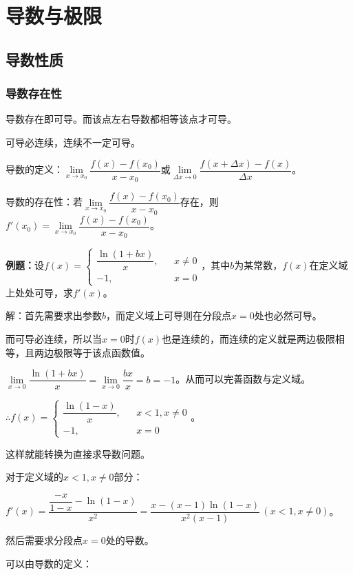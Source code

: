 \chapter{导数与极限}
\section{导数性质}

\subsection{导数存在性}

导数存在即可导。而该点左右导数都相等该点才可导。

可导必连续，连续不一定可导。

导数的定义：$\lim\limits_{x\to x_0}\dfrac{f(x)-f(x_0)}{x-x_0}$或$\lim\limits_{\Delta x\to 0}\dfrac{f(x+\Delta x)-f(x)}{\Delta x}$。

导数的存在性：若$\lim\limits_{x\to x_0}\dfrac{f(x)-f(x_0)}{x-x_0}$存在，则$f'(x_0)=\lim\limits_{x\to x_0}\dfrac{f(x)-f(x_0)}{x-x_0}$。\medskip

\textbf{例题：}设$f(x)=\left\{\begin{array}{lcl}
    \dfrac{\ln(1+bx)}{x}, & & x\neq 0 \\
    -1, & & x=0
\end{array}
\right.$，其中$b$为某常数，$f(x)$在定义域上处处可导，求$f'(x)$。

解：首先需要求出参数$b$，而定义域上可导则在分段点$x=0$处也必然可导。

而可导必连续，所以当$x=0$时$f(x)$也是连续的，而连续的定义就是两边极限相等，且两边极限等于该点函数值。\medskip

$\lim\limits_{x\to 0}\dfrac{\ln(1+bx)}{x}=\lim\limits_{x\to 0}\dfrac{bx}{x}=b=-1$。从而可以完善函数与定义域。\medskip

$\therefore f(x)=\left\{\begin{array}{lcl}
    \dfrac{\ln(1-x)}{x}, & & x<1,x\neq 0 \\
    -1, & & x=0
\end{array}
\right.$。

这样就能转换为直接求导数问题。

对于定义域的$x<1,x\neq 0$部分：\medskip

$f'(x)=\dfrac{\dfrac{-x}{1-x}-\ln(1-x)}{x^2}=\dfrac{x-(x-1)\ln(1-x)}{x^2(x-1)}\,(x<1,x\neq 0)$。

然后需要求分段点$x=0$处的导数。

可以由导数的定义：

